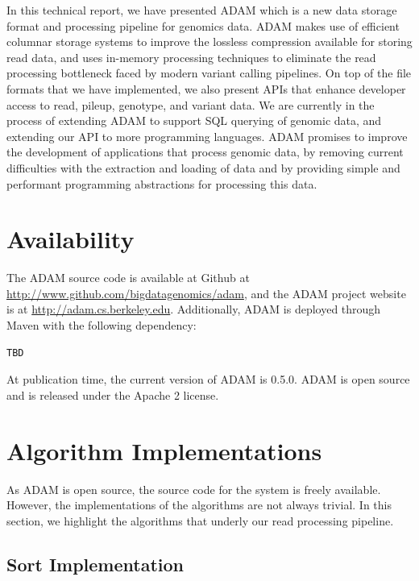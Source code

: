 \documentclass[10pt,twocolumn]{article}
\theoremstyle{plain}
\begin{document}
In this technical report, we have presented ADAM which is a new data storage format and processing pipeline for
genomics data. ADAM makes use of efficient columnar storage systems to improve the lossless compression available
for storing read data, and uses in-memory processing techniques to eliminate the read processing bottleneck faced
by modern variant calling pipelines. On top of the file formats that we have implemented, we also present APIs that enhance
developer access to read, pileup, genotype, and variant data. We are currently in the process of extending ADAM to
support SQL querying of genomic data, and extending our API to more programming languages. ADAM promises
to improve the development of applications that process genomic data, by removing current difficulties with the extraction
and loading of data and by providing simple and performant programming abstractions for processing this data.

\appendix

\section{Availability}
\label{sec:availability}

The ADAM source code is available at Github at \url{http://www.github.com/bigdatagenomics/adam}, and the ADAM project website
is at \url{http://adam.cs.berkeley.edu}. Additionally, ADAM is deployed through Maven with the following dependency:

\begin{verbatim}
TBD
\end{verbatim}

At publication time, the current version of ADAM is 0.5.0. ADAM is open source and is released under the Apache 2
license.

\section{Algorithm Implementations}
\label{sec:algorithm-implentations}

As ADAM is open source, the source code for the system is freely available. However, the implementations of the algorithms
are not always trivial. In this section, we highlight the algorithms that underly our read processing pipeline.

\subsection{Sort Implementation}
\label{sec:sort-implementation}
\end{document}
